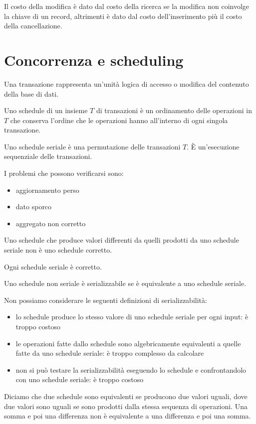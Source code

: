 Il costo della modifica \`e dato dal costo della ricerca se la modifica non coinvolge la chiave di un record, altrimenti \`e dato dal costo dell'inserimento pi\`u il costo della cancellazione.

\chapter{Concorrenza e scheduling}

Una transazione rappresenta un'unit\`a logica di accesso o modifica del contenuto della base di dati.

Uno schedule di un insieme $T$ di transazioni \`e un ordinamento delle operazioni in $T$ che conserva l'ordine che le operazioni hanno all'interno di ogni singola transazione.

Uno schedule seriale \`e una permutazione delle transazioni $T$. \`E un'esecuzione sequenziale delle transazioni.

I problemi che possono verificarsi sono:
\begin{itemize}
    \item aggiornamento perso
    \item dato sporco
    \item aggregato non corretto
\end{itemize}

Uno schedule che produce valori differenti da quelli prodotti da uno schedule seriale non \`e uno schedule corretto.

Ogni schedule seriale \`e corretto.

Uno schedule non seriale \`e serializzabile se \`e equivalente a uno schedule seriale.

Non possiamo considerare le seguenti definizioni di serializzabilit\`a:
\begin{itemize}
    \item lo schedule produce lo stesso valore di uno schedule seriale per ogni input: \`e troppo costoso
    \item le operazioni fatte dallo schedule sono algebricamente equivalenti a quelle fatte da uno schedule seriale: \`e troppo complesso da calcolare
    \item non si pu\`o testare la serializzabilit\`a eseguendo lo schedule e confrontandolo con uno schedule seriale: \`e troppo costoso
\end{itemize}

Diciamo che due schedule sono equivalenti se producono due valori uguali, dove due valori sono uguali se sono prodotti dalla stessa sequenza di operazioni. Una somma e poi una differenza non \`e equivalente a una differenza e poi una somma.

